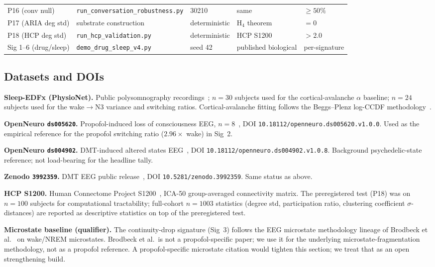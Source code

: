\begin{table}[ht]
\begin{tabular}{l l l l l}
P16 (conv null) & \texttt{run\_conversation\_robustness.py} & 30210 & same & $\geq 50\%$ \\
P17 (ARIA deg std) & substrate construction & deterministic & H$_4$ theorem & $=0$ \\
P18 (HCP deg std) & \texttt{run\_hcp\_validation.py} & deterministic & HCP S1200~\citep{VanEssen2013HCP} & $> 2.0$ \\
\midrule
Sig 1--6 (drug/sleep) & \texttt{demo\_drug\_sleep\_v4.py} & seed 42 & published biological & per-signature \\
\bottomrule
\end{tabular}
\end{table}

\subsection{Datasets and DOIs}

\textbf{Sleep-EDFx (PhysioNet).} Public polysomnography
recordings~\citep{SleepEDFx,PhysioNet2000}; $n=30$ subjects used for
the cortical-avalanche $\alpha$ baseline; $n=24$ subjects used for
the wake$\to$N3 variance and switching ratios. Cortical-avalanche
fitting follows the Beggs--Plenz log-CCDF
methodology~\citep{BeggsPlenz2003}.

\textbf{OpenNeuro \texttt{ds005620}.} Propofol-induced loss of
consciousness EEG, $n=8$~\citep{OpenNeuroDS005620},
DOI \texttt{10.18112/openneuro.ds005620.v1.0.0}. Used as the
empirical reference for the propofol switching ratio
($2.96\!\times$ wake) in Sig~2.

\textbf{OpenNeuro \texttt{ds004902}.} DMT-induced altered states
EEG~\citep{OpenNeuroDS004902},
DOI \texttt{10.18112/openneuro.ds004902.v1.0.8}. Background
psychedelic-state reference; not load-bearing for the headline tally.

\textbf{Zenodo \texttt{3992359}.} DMT EEG public
release~\citep{ZenodoDMT3992359},
DOI \texttt{10.5281/zenodo.3992359}. Same status as above.

\textbf{HCP S1200.} Human Connectome Project
S1200~\citep{VanEssen2013HCP}, ICA-50 group-averaged connectivity
matrix. The preregistered test (P18) was on $n=100$ subjects for
computational tractability; full-cohort $n=1003$ statistics
(degree std, participation ratio, clustering coefficient $\sigma$-
distances) are reported as descriptive statistics on top of the
preregistered test.

\textbf{Microstate baseline (qualifier).} The continuity-drop
signature (Sig~3) follows the EEG microstate methodology lineage of
Brodbeck et al.~\citep{Brodbeck2012Microstates} on wake/NREM
microstates. Brodbeck et al.\ is not a propofol-specific paper; we
use it for the underlying microstate-fragmentation methodology, not
as a propofol reference. A propofol-specific microstate citation
would tighten this section; we treat that as an open
strengthening build.


